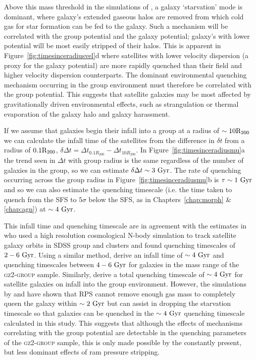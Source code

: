 Above this mass threshold in the simulations of \cite{fillingham16}, a galaxy `starvation' mode \citep{larson80, balogh00} is dominant, where galaxy's extended gaseous halos are removed from which cold gas for star formation can be fed to the galaxy. Such a mechanism will be correlated with the group potential and the galaxy potential; galaxy's with lower potential will be most easily stripped of their halos. This is apparent in Figure~\ref{fig:timesinceradiusvel}d where satellites with lower velocity dispersion (a proxy for the galaxy potential) are more rapidly quenched than their field and higher velocity dispersion counterparts. The dominant environmental quenching mechanism occurring in the group environment must therefore be correlated with the group potential. This suggests that satellite galaxies may be most affected by gravitationally driven environmental effects, such as strangulation or thermal evaporation of the galaxy halo and galaxy harassment. 

If we assume that galaxies begin their infall into a group at a radius of $\sim10\rm{R}_{200}$ we can calculate the infall time of the satellites from the difference in $\delta t$ from a radius of $0.1 \rm{R}_{200}$, $\delta \Delta t = \Delta t_{0.1R_{200}} - \Delta t_{10 R_{200}}$. In Figure~\ref{fig:timesinceradiusmu}a the trend seen in $\Delta t$ with group radius is the same regardless of the number of galaxies in the group, so we can estimate $\delta \Delta t \sim 3 ~\rm{Gyr}$. The rate of quenching occurring across the group radius in Figure~\ref{fig:timesinceradiusmu}b is $\tau \sim 1~\rm{Gyr}$ and so we can also estimate the quenching timescale (i.e. the time taken to quench from the SFS to $5\sigma$ below the SFS, as in Chapters~\ref{chap:morph} \& \ref{chap:agn}) at $\sim 4~\rm{Gyr}$.

This infall time and quenching timescale are in agreement with the estimates in \cite{wetzel13} who used a high resolution cosmological N-body simulation to track satellite galaxy orbits in SDSS group and clusters and found quenching timescales of $2-6~\rm{Gyr}$. Using a similar method, \cite{oman16} derive an infall time of $\sim4~\rm{Gyr}$ and quenching timescales between $4-6~\rm{Gyr}$ for galaxies in the mass range of the \textsc{gz2-group} sample. Similarly, \cite{hahn16} derive a total quenching timescale of $\sim4~\rm{Gyr}$ for satellite galaxies on infall into the group environment. However, the simulations by \cite{fillingham16} and \cite{emerick16} have shown that RPS cannot remove enough gas mass to completely queen the galaxy within $\sim2~\rm{Gyr}$ but can assist in dropping the starvation timescale so that galaxies can be quenched in the $\sim4~\rm{Gyr}$ quenching timescale calculated in this study. This suggests that although the effects of mechanisms correlating with the group potential are detectable in the quenching parameters of the \textsc{gz2-group} sample, this is only made possible by the constantly present, but less dominant effects of ram pressure stripping. 

